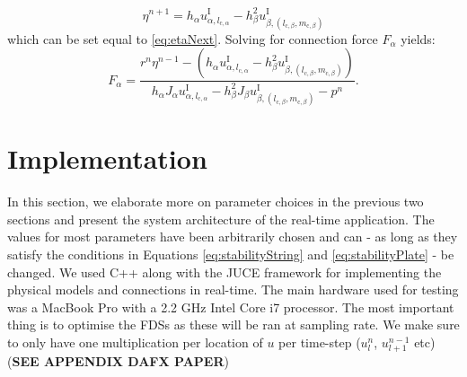 \documentclass{article}
\begin{document}
\begin{equation}
    \eta^{n+1} = h_\alpha u_{\alpha,l_{\text{c},\alpha}}^\text{I} - h^2_\beta u_{\beta,(l_{\text{c},\beta}, m_{\text{c},\beta})}^\text{I}
\end{equation}
which can be set equal to \eqref{eq:etaNext}. Solving for connection force $F_\alpha$ yields:
\begin{equation}
    F_\alpha = \frac{r^n\eta^{n-1}-(h_\alpha u_{\alpha, l_{\text{c},\alpha}}^\text{I} - h^2_\beta u_{\beta,(l_{\text{c},\beta},m_{\text{c},\beta})}^\text{I})}{h_\alpha J_\alpha u_{\alpha, l_{\text{c},\alpha}}^\text{I} - h^2_\beta J_\beta u_{\beta,(l_{\text{c},\beta},m_{\text{c},\beta})}^\text{I}-p^n}.
\end{equation}

\section{Implementation}\label{sec:implementation}
In this section, we elaborate more on parameter choices in the previous two sections and present the system architecture of the real-time application. The values for most parameters have been arbitrarily chosen and can - as long as they satisfy the conditions in Equations \eqref{eq:stabilityString} and \eqref{eq:stabilityPlate} - be changed. We used C++ along with the JUCE framework \cite{JUCE2019} for implementing the physical models and connections in real-time. The main hardware used for testing was a MacBook Pro with a 2.2 GHz Intel Core i7 processor.
The most important thing is to optimise the FDSs as these will be ran at sampling rate. We make sure to only have one multiplication per location of $u$ per time-step ($u_l^n$, $u_{l+1}^{n-1}$ etc) (\textbf{SEE APPENDIX DAFX PAPER}) %
\end{document}
